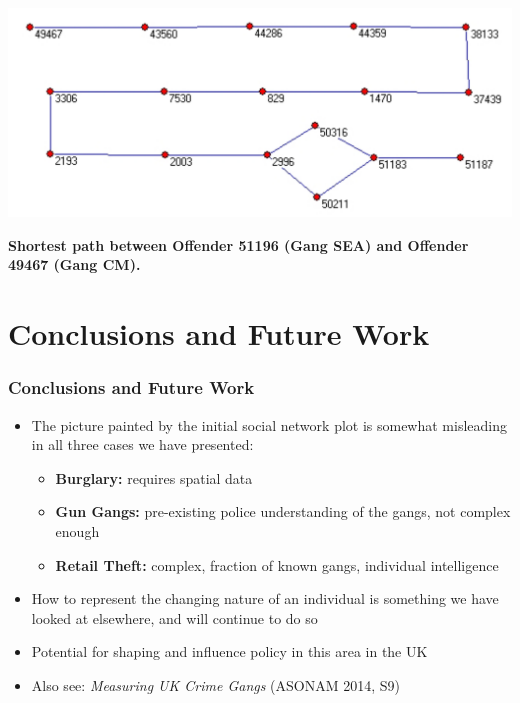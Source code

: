 \documentclass[pdftex]{beamer}
\begin{document}
\begin{frame}
\begin{center}
\includegraphics[width=0.9\paperwidth]{../images/path3.pdf}
\end{center}
\scriptsize{{\textbf{Shortest path between Offender 51196 (Gang SEA)
      and Offender 49467 (Gang CM).}}}
\end{frame}


\section{Conclusions and Future Work}

\begin{frame}
\frametitle{Conclusions and Future Work}
\begin{itemize}
\item The picture painted by the initial social network plot is somewhat
  misleading in all three cases we have presented:
\begin{itemize}
\item {\textbf{Burglary:}} requires spatial data
\item {\textbf{Gun Gangs:}} pre-existing police understanding of the gangs, not
  complex enough
\item {\textbf{Retail Theft:}} complex, fraction of known gangs, individual intelligence
\end{itemize}
\pause
\item How to represent the changing nature of an individual is
  something we have looked at elsewhere, and will continue to do so
\pause
\item Potential for shaping and influence policy in this area in
  the UK
\pause
\item Also see: {\emph{Measuring UK Crime Gangs}} (ASONAM 2014, S9)
\end{itemize}
\end{frame}
\end{document}

